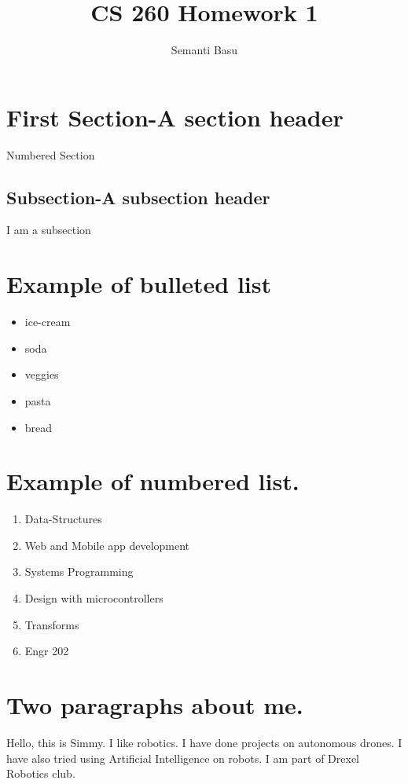 \documentclass{article}
\begin{document}
\title {CS 260 Homework 1}
\author{Semanti Basu}
\maketitle
\section{First Section-A section header}
Numbered Section
\subsection{Subsection-A subsection header}
I am a subsection

\section*{Example of bulleted list}


\begin{itemize}
\item ice-cream
\item soda
\item veggies
\item pasta
\item bread
\end{itemize}



\section*{Example of numbered list.}




\begin{enumerate}
\item Data-Structures
\item Web and Mobile app development
\item Systems Programming
\item Design with microcontrollers
\item Transforms
\item Engr 202
\end{enumerate}



\section*{Two paragraphs about me.}




Hello, this is Simmy. I like robotics. I have done projects on autonomous drones. I have also tried using Artificial Intelligence on robots. I am part of Drexel Robotics club.
\end{document}
